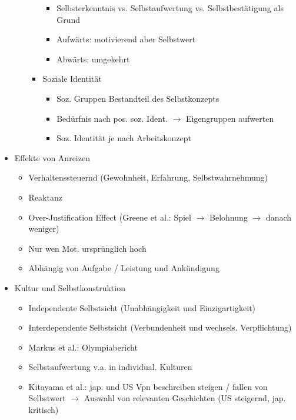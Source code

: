 \documentclass[11pt, paper=a4, twocolumn]{scrartcl}
\begin{document}
\begin{itemize}
\begin{itemize}
\begin{itemize}
\begin{itemize}
									\item Selbsterkenntnis vs. Selbstaufwertung vs. Selbstbestätigung als Grund
									\item Aufwärts: motivierend aber Selbstwert
									\item Abwärts: umgekehrt
								\end{itemize}
							\item Soziale Identität
								\begin{itemize}
									\item Soz. Gruppen Bestandteil des Selbstkonzepts
									\item Bedürfnis nach pos. soz. Ident. $\rightarrow$ Eigengruppen aufwerten
									\item Soz. Identität je nach Arbeitskonzept
								\end{itemize}
						\end{itemize}
				\end{itemize}
			\item Effekte von Anreizen
				\begin{itemize}
					\item Verhaltenssteuernd (Gewohnheit, Erfahrung, Selbstwahrnehmung)
					\item Reaktanz
					\item Over-Justification Effect (Greene et al.: Spiel $\rightarrow$ Belohnung $\rightarrow$ danach weniger)
					\item Nur wen Mot. ursprünglich hoch
					\item Abhängig von Aufgabe / Leistung und Ankündigung
				\end{itemize}
			\item Kultur und Selbstkonstruktion
				\begin{itemize}
					\item Independente Selbstsicht (Unabhängigkeit und Einzigartigkeit)
					\item Interdependente Selbstsicht (Verbundenheit und wechsels. Verpflichtung)
					\item Markus et al.: Olympiabericht
					\item Selbstaufwertung v.a. in individual. Kulturen
					\item Kitayama et al.: jap. und US Vpn beschreiben steigen / fallen von Selbstwert
						$\rightarrow$ Auswahl von relevanten Geschichten (US steigernd, jap. kritisch)
				\end{itemize}

				
		\end{itemize}
\end{document}
